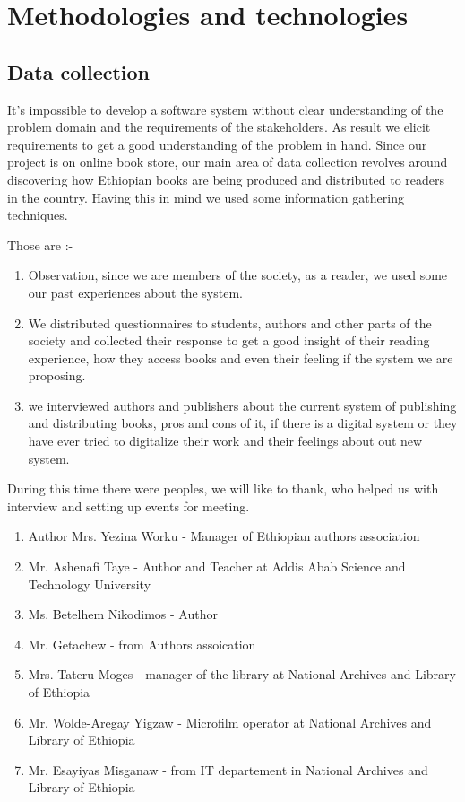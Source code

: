 	\section{Methodologies and technologies}
		\subsection{Data collection}

It's impossible to develop a software system without clear understanding of the problem domain and the requirements of the stakeholders. As result we elicit requirements to get a good understanding of the problem in hand. Since our project is on online book store, our main area of data collection revolves around discovering how Ethiopian books are being produced and distributed to readers in the country. Having this in mind we used some information gathering techniques.

Those are :-

\begin{enumerate}
\item Observation, since we are members of the society, as a reader, we used some our past experiences about the system.
\item We distributed questionnaires to students, authors and other parts of the society and collected their response to get a good insight of their reading experience, how they access books and even their feeling if the system we are proposing.
\item we interviewed authors and publishers about the current system of publishing and distributing books, pros and cons of it, if there is a digital system or they have ever tried to digitalize their work and their feelings about out new system. 
\end{enumerate}


During this time there were peoples, we will like to thank, who helped us with interview and setting up events for meeting.  

\begin{enumerate}
\item Author Mrs. Yezina Worku - Manager of Ethiopian authors association
\item Mr. Ashenafi Taye - Author and Teacher at Addis Abab Science and Technology University
\item Ms. Betelhem Nikodimos - Author
\item Mr. Getachew - from Authors assoication
\item Mrs. Tateru Moges - manager of the library at National Archives and Library of Ethiopia
\item Mr. Wolde-Aregay Yigzaw - Microfilm operator at National Archives and Library of Ethiopia
\item Mr. Esayiyas Misganaw - from IT departement in National Archives and Library of Ethiopia
\end{enumerate}

